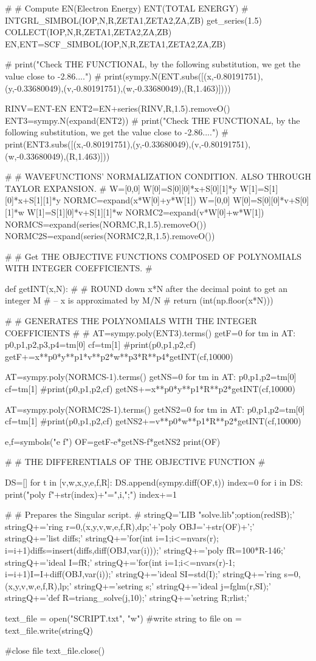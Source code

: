 #
# Compute EN(Electron Energy) ENT(TOTAL ENERGY)
#
INTGRL_SIMBOL(IOP,N,R,ZETA1,ZETA2,ZA,ZB)
get_series(1.5)
COLLECT(IOP,N,R,ZETA1,ZETA2,ZA,ZB)
EN,ENT=SCF_SIMBOL(IOP,N,R,ZETA1,ZETA2,ZA,ZB)

#
print("Check THE FUNCTIONAL, by the following substitution, we get the value close to -2.86....")
#
print(sympy.N(ENT.subs([(x,-0.80191751),(y,-0.33680049),(v,-0.80191751),(w,-0.33680049),(R,1.463)])))


RINV=ENT-EN
ENT2=EN+series(RINV,R,1.5).removeO()
ENT3=sympy.N(expand(ENT2))
#
print("Check THE FUNCTIONAL, by the following substitution, we get the value close to -2.86....")
#
print(ENT3.subs([(x,-0.80191751),(y,-0.33680049),(v,-0.80191751),(w,-0.33680049),(R,1.463)]))

#
#  WAVEFUNCTIONS' NORMALIZATION CONDITION. ALSO THROUGH TAYLOR EXPANSION.
#
W=[0,0]
W[0]=S[0][0]*x+S[0][1]*y
W[1]=S[1][0]*x+S[1][1]*y
NORMC=expand(x*W[0]+y*W[1])
W=[0,0]
W[0]=S[0][0]*v+S[0][1]*w
W[1]=S[1][0]*v+S[1][1]*w
NORMC2=expand(v*W[0]+w*W[1])
NORMCS=expand(series(NORMC,R,1.5).removeO())
NORMC2S=expand(series(NORMC2,R,1.5).removeO())

#
#  Get THE OBJECTIVE FUNCTIONS COMPOSED OF POLYNOMIALS WITH INTEGER COEFFICIENTS.
#

def getINT(x,N):
#
# ROUND down x*N  after the decimal point to get an integer M
#       -- x is approximated by M/N
#
    return (int(np.floor(x*N)))

#
#  GENERATES THE POLYNOMIALS WITH THE INTEGER COEFFICIENTS
#
#
AT=sympy.poly(ENT3).terms()
getF=0
for tm in AT:
    p0,p1,p2,p3,p4=tm[0]
    cf=tm[1]
    #print(p0,p1,p2,cf)
    getF+=x**p0*y**p1*v**p2*w**p3*R**p4*getINT(cf,10000)

AT=sympy.poly(NORMCS-1).terms()
getNS=0
for tm in AT:
    p0,p1,p2=tm[0]
    cf=tm[1]
    #print(p0,p1,p2,cf)
    getNS+=x**p0*y**p1*R**p2*getINT(cf,10000)
    
AT=sympy.poly(NORMC2S-1).terms()
getNS2=0
for tm in AT:
    p0,p1,p2=tm[0]
    cf=tm[1]
    #print(p0,p1,p2,cf)
    getNS2+=v**p0*w**p1*R**p2*getINT(cf,10000)

e,f=symbols("e f")
OF=getF-e*getNS-f*getNS2
print(OF)

#
# THE DIFFERENTIALS OF THE OBJECTIVE FUNCTION
#

DS=[]
for t in [v,w,x,y,e,f,R]:
    DS.append(sympy.diff(OF,t))
index=0
for i in DS:
    print("poly f"+str(index)+"=",i,";\n")
    index+=1


#
# Prepares the Singular script. 
#
stringQ='LIB "solve.lib";option(redSB);\n'
stringQ+='ring r=0,(x,y,v,w,e,f,R),dp;\n'+'poly OBJ='+str(OF)+';\n'
stringQ+='list diffs;\n'
stringQ+='for(int i=1;i<=nvars(r); i=i+1){diffs=insert(diffs,diff(OBJ,var(i)));}\n'
stringQ+='poly fR=100*R-146;\n'
stringQ+='ideal I=fR;\n'
stringQ+='for(int i=1;i<=nvars(r)-1; i=i+1){I=I+diff(OBJ,var(i));}\n'
stringQ+='ideal SI=std(I);\n'
stringQ+='ring s=0,(x,y,v,w,e,f,R),lp;\n'
stringQ+='setring s;\n'
stringQ+='ideal j=fglm(r,SI);\n'
stringQ+='def R=triang_solve(j,10);\n'
stringQ+='setring R;rlist;'

text_file = open("SCRIPT.txt", "w")
#write string to file
on = text_file.write(stringQ)
 
#close file
text_file.close()

